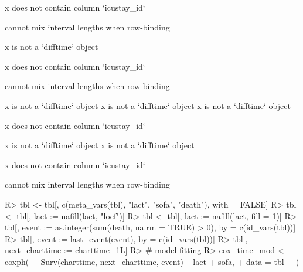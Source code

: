 \documentclass[
]{jss}
\begin{document}
\begin{CodeChunk}
\begin{CodeOutput}
x does not contain column `icustay_id`
\end{CodeOutput}

\begin{CodeOutput}
cannot mix interval lengths when row-binding
\end{CodeOutput}

\begin{CodeOutput}
x is not a `difftime` object
\end{CodeOutput}

\begin{CodeOutput}
x does not contain column `icustay_id`
\end{CodeOutput}

\begin{CodeOutput}
cannot mix interval lengths when row-binding
\end{CodeOutput}

\begin{CodeOutput}
x is not a `difftime` object
x is not a `difftime` object
x is not a `difftime` object
\end{CodeOutput}

\begin{CodeOutput}
x does not contain column `icustay_id`
\end{CodeOutput}

\begin{CodeOutput}
x is not a `difftime` object
x is not a `difftime` object
\end{CodeOutput}

\begin{CodeOutput}
x does not contain column `icustay_id`
\end{CodeOutput}

\begin{CodeOutput}
cannot mix interval lengths when row-binding
\end{CodeOutput}

\begin{CodeInput}
R> tbl <- tbl[, c(meta_vars(tbl), "lact", "sofa", "death"), with = FALSE]
R> tbl <- tbl[, lact := nafill(lact, "locf")]
R> tbl <- tbl[, lact := nafill(lact, fill = 1)]
R> tbl[, event := as.integer(sum(death, na.rm = TRUE) > 0), by = c(id_vars(tbl))]
R> tbl[, event := last_event(event), by = c(id_vars(tbl))]
R> tbl[, next_charttime := charttime+1L]
R> # model fitting
R> cox_time_mod <- coxph(
+   Surv(charttime, next_charttime, event) ~ lact + sofa,
+   data = tbl
+ )
\end{CodeInput}
\end{CodeChunk}
\end{document}
